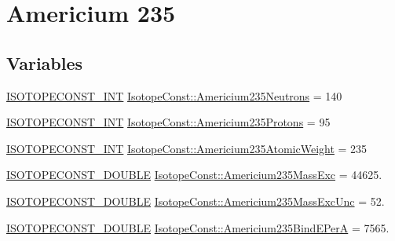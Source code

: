 \hypertarget{group___isotope_const-_americium-_am235}{}\section{Americium 235}
\label{group___isotope_const-_americium-_am235}
\subsection*{Variables}
\begin{DoxyCompactItemize}
\item 
\mbox{\hyperlink{group___isotope_const-_macros_ga5f18360b3e99483a35c32d789e62621c}{I\+S\+O\+T\+O\+P\+E\+C\+O\+N\+S\+T\+\_\+\+I\+NT}} \mbox{\hyperlink{group___isotope_const-_americium-_am235_ga300510ee39be59b4477da397b9477fc8}{Isotope\+Const\+::\+Americium235\+Neutrons}} = 140
\item 
\mbox{\hyperlink{group___isotope_const-_macros_ga5f18360b3e99483a35c32d789e62621c}{I\+S\+O\+T\+O\+P\+E\+C\+O\+N\+S\+T\+\_\+\+I\+NT}} \mbox{\hyperlink{group___isotope_const-_americium-_am235_gacb58d99c5d94f877af9dc7cc1b0bd00d}{Isotope\+Const\+::\+Americium235\+Protons}} = 95
\item 
\mbox{\hyperlink{group___isotope_const-_macros_ga5f18360b3e99483a35c32d789e62621c}{I\+S\+O\+T\+O\+P\+E\+C\+O\+N\+S\+T\+\_\+\+I\+NT}} \mbox{\hyperlink{group___isotope_const-_americium-_am235_gaae3c84b3e26f15484d1e37fac255385b}{Isotope\+Const\+::\+Americium235\+Atomic\+Weight}} = 235
\item 
\mbox{\hyperlink{group___isotope_const-_macros_ga8f45a7272ce02c0b4c65c44636ed719a}{I\+S\+O\+T\+O\+P\+E\+C\+O\+N\+S\+T\+\_\+\+D\+O\+U\+B\+LE}} \mbox{\hyperlink{group___isotope_const-_americium-_am235_gad41906014bba28d40225c2b9308ada36}{Isotope\+Const\+::\+Americium235\+Mass\+Exc}} = 44625.
\item 
\mbox{\hyperlink{group___isotope_const-_macros_ga8f45a7272ce02c0b4c65c44636ed719a}{I\+S\+O\+T\+O\+P\+E\+C\+O\+N\+S\+T\+\_\+\+D\+O\+U\+B\+LE}} \mbox{\hyperlink{group___isotope_const-_americium-_am235_gace3f9a2a18d503abf15b83d45066477a}{Isotope\+Const\+::\+Americium235\+Mass\+Exc\+Unc}} = 52.
\item 
\mbox{\hyperlink{group___isotope_const-_macros_ga8f45a7272ce02c0b4c65c44636ed719a}{I\+S\+O\+T\+O\+P\+E\+C\+O\+N\+S\+T\+\_\+\+D\+O\+U\+B\+LE}} \mbox{\hyperlink{group___isotope_const-_americium-_am235_gafeb59d73baf6a5ed4b99f8cb61148392}{Isotope\+Const\+::\+Americium235\+Bind\+E\+PerA}} = 7565.
\item 

\end{DoxyCompactItemize}
